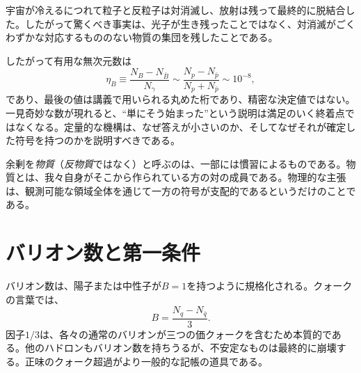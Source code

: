 \begin{classroomqa}
\end{classroomqa}

宇宙が冷えるにつれて粒子と反粒子は対消滅し、放射は残って最終的に脱結合した。したがって驚くべき事実は、光子が生き残ったことではなく、対消滅がごくわずかな対応するもののない物質の集団を残したことである。

したがって有用な無次元数は
\begin{equation}
\eta_B
\equiv
\frac{N_B-N_{\bar B}}{N_\gamma}
\sim
\frac{N_p-N_{\bar p}}{N_p+N_{\bar p}}
\sim 10^{-8},
\label{eq:c08-baryon-asymmetry}
\end{equation}
であり、最後の値は講義で用いられる丸めた桁であり、精密な決定値ではない。一見奇妙な数が現れると、``単にそう始まった''という説明は満足のいく終着点ではなくなる。定量的な機構は、なぜ答えが小さいのか、そしてなぜそれが確定した符号を持つのかを説明すべきである。

余剰を\emph{物質}（\emph{反物質}ではなく）と呼ぶのは、一部には慣習によるものである。物質とは、我々自身がそこから作られている方の対の成員である。物理的な主張は、観測可能な領域全体を通じて一方の符号が支配的であるというだけのことである。

\section{バリオン数と第一条件}

バリオン数は、陽子または中性子が\(B=1\)を持つように規格化される。クォークの言葉では、
\begin{equation}
B=\frac{N_q-N_{\bar q}}{3}.
\label{eq:c08-baryon-number}
\end{equation}
因子\(1/3\)は、各々の通常のバリオンが三つの価クォークを含むため本質的である。他のハドロンもバリオン数を持ちうるが、不安定なものは最終的に崩壊する。正味のクォーク超過がより一般的な記帳の道具である。

\begin{classroomqa}
\end{classroomqa}

